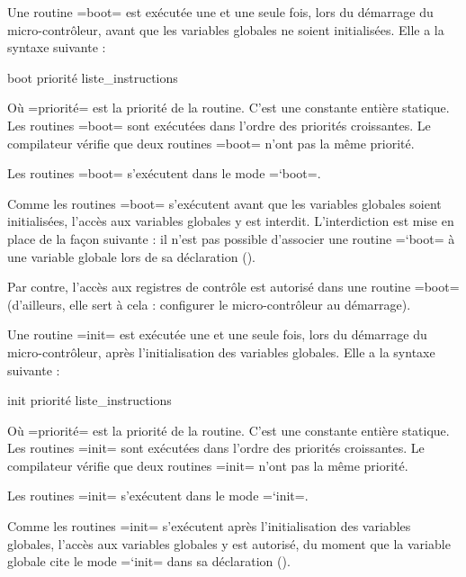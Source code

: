 
Une routine \plm=boot= est exécutée une et une seule fois, lors du démarrage du micro-contrôleur, avant que les variables globales ne soient initialisées. Elle a la syntaxe suivante :
\begin{PLM}
boot priorité {
  liste_instructions
}
\end{PLM}
Où \plm=priorité= est la priorité de la routine. C'est une constante entière statique. Les routines \plm=boot= sont exécutées dans l'ordre des priorités croissantes. Le compilateur vérifie que deux routines \plm=boot= n'ont pas la même priorité.

Les routines \plm=boot= s'exécutent dans le mode \plm=`boot=.

Comme les routines \plm=boot= s'exécutent avant que les variables globales soient initialisées, l'accès aux variables globales y est interdit. L'interdiction est mise en place de la façon suivante : il n'est pas possible d'associer une routine \plm=`boot= à une variable globale lors de sa déclaration ().

Par contre, l'accès aux registres de contrôle est autorisé dans une routine \plm=boot= (d'ailleurs, elle sert à cela : configurer le micro-contrôleur au démarrage).








Une routine \plm=init= est exécutée une et une seule fois, lors du démarrage du micro-contrôleur, après l'initialisation des variables globales. Elle a la syntaxe suivante :
\begin{PLM}
init priorité {
  liste_instructions
}
\end{PLM}
Où \plm=priorité= est la priorité de la routine. C'est une constante entière statique. Les routines \plm=init= sont exécutées dans l'ordre des priorités croissantes. Le compilateur vérifie que deux routines \plm=init= n'ont pas la même priorité.

Les routines \plm=init= s'exécutent dans le mode \plm=`init=.

Comme les routines \plm=init= s'exécutent après l'initialisation des variables globales, l'accès aux variables globales y est autorisé, du moment que la variable globale cite le mode \plm=`init= dans sa déclaration ().






